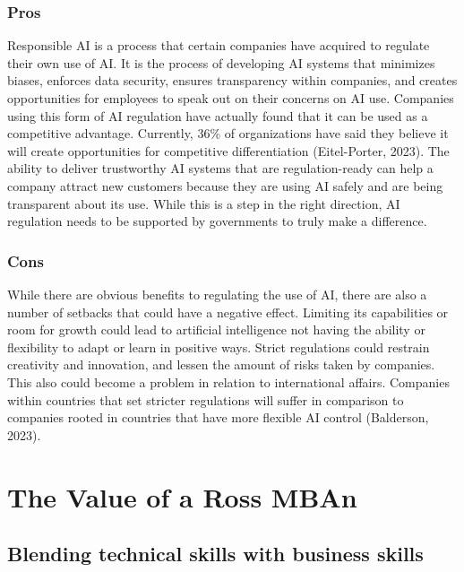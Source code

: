\documentclass[
]{book}
\begin{document}
\hypertarget{pros}{%
\subsection{Pros}\label{pros}}

Responsible AI is a process that certain companies have acquired to regulate their own use of AI. It is the process of developing AI systems that minimizes biases, enforces data security, ensures transparency within companies, and creates opportunities for employees to speak out on their concerns on AI use. Companies using this form of AI regulation have actually found that it can be used as a competitive advantage. Currently, 36\% of organizations have said they believe it will create opportunities for competitive differentiation (Eitel-Porter, 2023). The ability to deliver trustworthy AI systems that are regulation-ready can help a company attract new customers because they are using AI safely and are being transparent about its use. While this is a step in the right direction, AI regulation needs to be supported by governments to truly make a difference.

\hypertarget{cons}{%
\subsection{Cons}\label{cons}}

While there are obvious benefits to regulating the use of AI, there are also a number of setbacks that could have a negative effect. Limiting its capabilities or room for growth could lead to artificial intelligence not having the ability or flexibility to adapt or learn in positive ways. Strict regulations could restrain creativity and innovation, and lessen the amount of risks taken by companies. This also could become a problem in relation to international affairs. Companies within countries that set stricter regulations will suffer in comparison to companies rooted in countries that have more flexible AI control (Balderson, 2023).

\hypertarget{the-value-of-a-ross-mban}{%
\chapter{The Value of a Ross MBAn}\label{the-value-of-a-ross-mban}}

\hypertarget{blending-technical-skills-with-business-skills}{%
\section{Blending technical skills with business skills}\label{blending-technical-skills-with-business-skills}}
\end{document}
